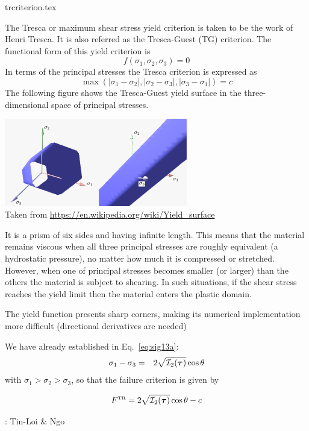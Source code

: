 \begin{flushright} {\tiny {\color{gray} trcriterion.tex}} \end{flushright}

The Tresca or maximum shear stress yield criterion is taken to be the work of Henri Tresca. It is also referred as the Tresca-Guest (TG) criterion. The functional form of this yield criterion is
\[
f(\sigma_1,\sigma_2,\sigma_3) = 0
\]
In terms of the principal stresses the Tresca criterion is expressed as
\[
{\max(|\sigma_1 - \sigma_2| , |\sigma_2 - \sigma_3| , |\sigma_3 - \sigma_1| ) = c }
\]
The following figure shows the Tresca-Guest yield surface in the three-dimensional space of principal stresses. 
\begin{center}
\includegraphics[width=0.6\textwidth]{images/rheology/tresca/Tresca.pdf}\\
{\captionfont Taken from \url{https://en.wikipedia.org/wiki/Yield_surface}}
\end{center}
It is a prism of six sides and having infinite length. This means that the 
material remains viscous when all three principal stresses are roughly equivalent 
(a hydrostatic pressure), no matter how much it is compressed or stretched. 
However, when one of principal stresses becomes smaller (or larger) than the others 
the material is subject to shearing. In such situations, if the shear 
stress reaches the yield limit then the material enters the plastic domain. 

\begin{remark}
The yield function presents sharp corners, making its numerical implementation 
more difficult (directional derivatives are needed)
\end{remark}

We have already established in Eq.~\eqref{eq:sig13a}:
\begin{eqnarray}
\sigma_1 - \sigma_3  &=& 2 \sqrt{{\cal I}_2({\bm \tau})} \cos \theta \nonumber
\end{eqnarray}
with $\sigma_1>\sigma_2>\sigma_3$,
so that the failure criterion is given by
\begin{mdframed}[backgroundcolor=blue!5]
\[
F^{\text{\tiny TR}}=2\sqrt{ {\cal I}_2({\bm \tau})  } \cos \theta - c 
\]
\end{mdframed}

\Literature: Tin-Loi \& Ngo \cite{ting03}




\newpage
